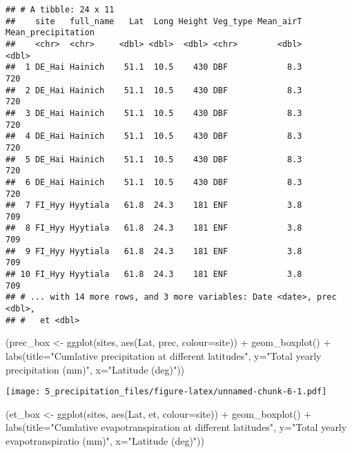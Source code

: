 \documentclass[
]{article}
\newenvironment{Shaded}{\begin{snugshade}}{\end{snugshade}}
\newcommand{\AttributeTok}[1]{\textcolor[rgb]{0.77,0.63,0.00}{#1}}
\newcommand{\FunctionTok}[1]{\textcolor[rgb]{0.00,0.00,0.00}{#1}}
\newcommand{\NormalTok}[1]{#1}
\newcommand{\OtherTok}[1]{\textcolor[rgb]{0.56,0.35,0.01}{#1}}
\newcommand{\SpecialCharTok}[1]{\textcolor[rgb]{0.00,0.00,0.00}{#1}}
\newcommand{\StringTok}[1]{\textcolor[rgb]{0.31,0.60,0.02}{#1}}
\begin{document}
\begin{verbatim}
## # A tibble: 24 x 11
##    site   full_name   Lat  Long Height Veg_type Mean_airT Mean_precipitation
##    <chr>  <chr>     <dbl> <dbl>  <dbl> <chr>        <dbl>              <dbl>
##  1 DE_Hai Hainich    51.1  10.5    430 DBF            8.3                720
##  2 DE_Hai Hainich    51.1  10.5    430 DBF            8.3                720
##  3 DE_Hai Hainich    51.1  10.5    430 DBF            8.3                720
##  4 DE_Hai Hainich    51.1  10.5    430 DBF            8.3                720
##  5 DE_Hai Hainich    51.1  10.5    430 DBF            8.3                720
##  6 DE_Hai Hainich    51.1  10.5    430 DBF            8.3                720
##  7 FI_Hyy Hyytiala   61.8  24.3    181 ENF            3.8                709
##  8 FI_Hyy Hyytiala   61.8  24.3    181 ENF            3.8                709
##  9 FI_Hyy Hyytiala   61.8  24.3    181 ENF            3.8                709
## 10 FI_Hyy Hyytiala   61.8  24.3    181 ENF            3.8                709
## # ... with 14 more rows, and 3 more variables: Date <date>, prec <dbl>,
## #   et <dbl>
\end{verbatim}

\begin{Shaded}
\begin{Highlighting}[]
\NormalTok{(prec\_box }\OtherTok{\textless{}{-}}  \FunctionTok{ggplot}\NormalTok{(sites, }\FunctionTok{aes}\NormalTok{(Lat, prec, }\AttributeTok{colour=}\NormalTok{site)) }\SpecialCharTok{+}
  \FunctionTok{geom\_boxplot}\NormalTok{() }\SpecialCharTok{+}
   \FunctionTok{labs}\NormalTok{(}\AttributeTok{title=}\StringTok{"Cumlative precipitation at different latitudes"}\NormalTok{,}
        \AttributeTok{y=}\StringTok{"Total yearly precipitation (mm)"}\NormalTok{,}
        \AttributeTok{x=}\StringTok{"Latitude (deg)"}\NormalTok{))}
\end{Highlighting}
\end{Shaded}

\texttt{[image: 5\_precipitation\_files/figure-latex/unnamed-chunk-6-1.pdf]}

\begin{Shaded}
\begin{Highlighting}[]
\NormalTok{(et\_box }\OtherTok{\textless{}{-}} \FunctionTok{ggplot}\NormalTok{(sites, }\FunctionTok{aes}\NormalTok{(Lat, et, }\AttributeTok{colour=}\NormalTok{site)) }\SpecialCharTok{+}
  \FunctionTok{geom\_boxplot}\NormalTok{() }\SpecialCharTok{+}
    \FunctionTok{labs}\NormalTok{(}\AttributeTok{title=}\StringTok{"Cumlative evapotranspiration at different latitudes"}\NormalTok{,}
        \AttributeTok{y=}\StringTok{"Total yearly evapotranspiratio (mm)"}\NormalTok{,}
        \AttributeTok{x=}\StringTok{"Latitude (deg)"}\NormalTok{))}
\end{Highlighting}
\end{Shaded}
\end{document}
